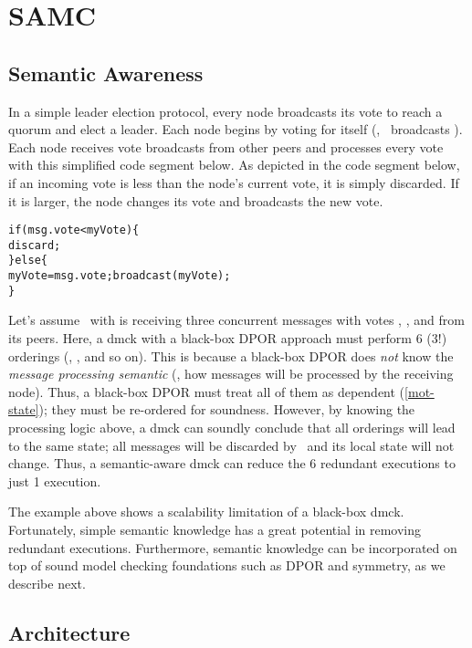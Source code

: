 \section{SAMC}

\subsection{Semantic Awareness}

In a simple leader election protocol, every node broadcasts its vote to reach a
quorum and elect a leader.  Each node begins by voting for itself (\eg, \ntwo\
broadcasts ).  Each node receives vote broadcasts from other peers
and processes every vote with this simplified code segment below.  As depicted
in the code segment below, if an incoming vote is less than the node's current
vote, it is simply discarded.  If it is larger, the node changes its vote and
broadcasts the new vote.

\begin{alltt}
if (msg.vote < myVote) \{
  discard;
\} else \{
  myVote = msg.vote; broadcast(myVote);
\}
\end{alltt}

Let's assume \nfour\ with  is receiving three concurrent messages
with votes \ts{1}, \ts{2}, and \ts{3} from its peers.  Here, a dmck with a
black-box DPOR approach must perform 6 (3!) orderings (\ts{123}, \ts{132}, and
so on).  This is because a black-box DPOR does {\em not} know the {\em message
processing semantic} (\ie, how messages will be processed by the receiving
node).  Thus, a black-box DPOR must treat all of them as dependent
(\sec\ref{mot-state}); they must be re-ordered for soundness.  However, by
knowing the processing logic above, a dmck can soundly conclude that all
orderings will lead to the same state; all messages will be discarded by \nfour\
and its local state will not change.  Thus, a semantic-aware dmck can reduce the
6 redundant executions to just 1 execution.

The example above shows a scalability limitation of a black-box dmck.
Fortunately, simple semantic knowledge has a great potential in removing
redundant executions.  Furthermore, semantic knowledge can be incorporated on
top of sound model checking foundations such as DPOR and symmetry, as we
describe next.

\subsection{Architecture}
\label{sam-arch}

